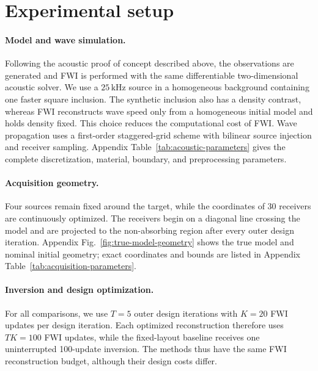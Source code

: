 \section{Experimental setup}

\paragraph{Model and wave simulation.}
Following the acoustic proof of concept described above, the observations are generated and FWI is performed with the same differentiable two-dimensional 
acoustic solver. We use a $25\,\mathrm{kHz}$ source in a homogeneous background
containing one faster square inclusion. The synthetic inclusion also has a
density contrast, whereas FWI reconstructs wave speed only from a homogeneous
initial model and holds density fixed. This choice reduces the computational cost of FWI. Wave propagation uses a first-order
staggered-grid scheme with bilinear source injection and receiver sampling.
Appendix Table~\ref{tab:acoustic-parameters} gives the complete discretization,
material, boundary, and preprocessing parameters.

\paragraph{Acquisition geometry.}
Four sources remain fixed around the target, while the coordinates of 30 receivers are continuously optimized. The receivers begin on a diagonal line crossing the
model and are projected to the non-absorbing region after every outer
design iteration. Appendix Fig.~\ref{fig:true-model-geometry} shows the true
model and nominal initial geometry; exact coordinates and bounds are listed in
Appendix Table~\ref{tab:acquisition-parameters}.

\paragraph{Inversion and design optimization.}

For all comparisons, we use $T=5$ outer design iterations with $K=20$ FWI updates per design iteration. Each
optimized reconstruction therefore uses $TK=100$ FWI updates, while the
fixed-layout baseline receives one uninterrupted 100-update inversion. The
methods thus have the same FWI reconstruction budget, although their design costs
differ.

